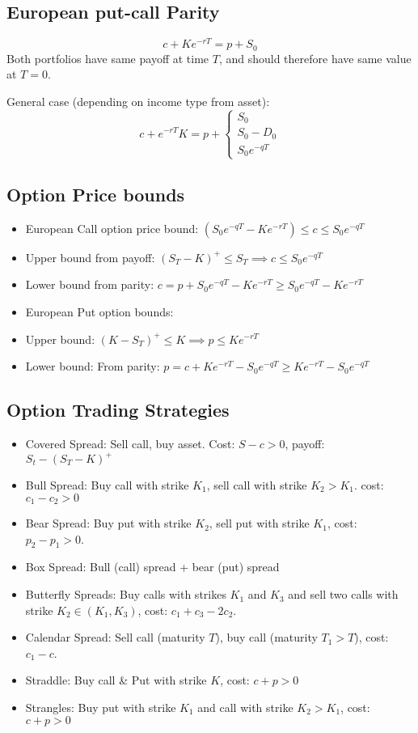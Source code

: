 \documentclass{article}
\begin{document}
\subsection*{European put-call Parity}
$$c + Ke^{-rT} = p + S_0$$
Both portfolios have same payoff at time $T$, and should therefore have same value at $T=0$.

General case (depending on income type from asset):
$$c + e^{-rT}K = p + \begin{cases} S_0 \\ S_0 - D_0 \\ S_0e^{-qT} \end{cases}$$


\subsection*{Option Price bounds}
\begin{itemize}
	\item European Call option price bound: $(S_0 e^{-qT} - Ke^{-rT}) \leq c \leq S_0 e^{-qT}$
	\item Upper bound from payoff: $(S_T - K)^+ \leq S_T \implies c \leq S_0e^{-qT}$
	\item Lower bound from parity: $c = p + S_0e^{-qT} - Ke^{-rT} \geq S_0e^{-qT} - Ke^{-rT}$
	\item European Put option bounds:
	\item Upper bound: $(K-S_T)^+ \leq K \implies p \leq Ke^{-rT}$
	\item Lower bound: From parity: $p = c + Ke^{-rT} - S_0e^{-qT} \geq Ke^{-rT} - S_0e^{-qT}$
\end{itemize}


\subsection*{Option Trading Strategies}

\begin{itemize}
	\item Covered Spread: Sell call, buy asset. Cost: $S-c > 0$, payoff: $S_t - (S_T - K)^+$
	\item Bull Spread: Buy call with strike $K_1$, sell call with strike $K_2>K_1$. cost: $c_1-c_2 > 0$
	\item Bear Spread: Buy put with strike $K_2$, sell put with strike $K_1$, cost: $p_2 - p_1 > 0$.
	\item Box Spread: Bull (call) spread + bear (put) spread
	\item Butterfly Spreads: Buy calls with strikes $K_1$ and $K_3$ and sell two calls with strike $K_2 \in (K_1, K_3)$, cost: $c_1 + c_3 - 2c_2$.
	\item Calendar Spread: Sell call (maturity $T$), buy call (maturity $T_1 > T$), cost: $c_1 - c$.
	\item Straddle: Buy call \& Put with strike $K$, cost: $c + p > 0$
	\item Strangles: Buy put with strike $K_1$ and call with strike $K_2 > K_1$, cost: $c + p > 0$
\end{itemize}
\end{document}
